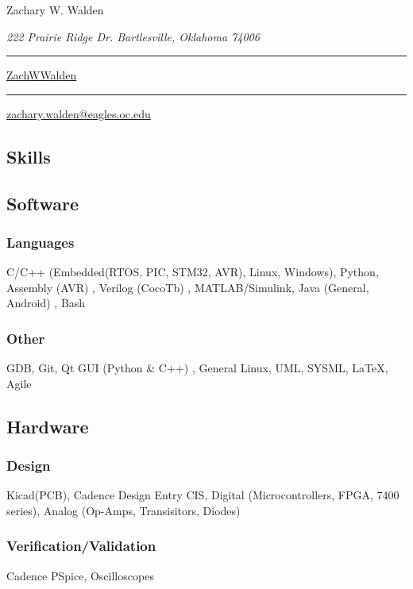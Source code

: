 \documentclass{article}
\newcommand\mybar{\kern1pt\rule[-\dp\strutbox]{.8pt}{\baselineskip}\kern1pt}
\begin{document}
\begin{center}
	\begin{Huge}
		Zachary W. Walden\\
	\end{Huge}
	\begin{large}
		\textsl{222 Prairie Ridge Dr. Bartlesville, Oklahoma 74006}\\
	\end{large}
	\begin{small}
		 \mybar { } \faGithub \href{https://github.com/ZachWWalden}{ ZachWWalden}
		\mybar { }\faEnvelope\href{mailto::zachary.walden@eagles.oc.edu}{ zachary.walden@eagles.oc.edu}
	\end{small}
\end{center}
\begin{spacing}{.5}
\section{Skills}
	\subsection{Software}
		\subsubsection{Languages} \small{C/C++} \scriptsize{(Embedded(RTOS, PIC, STM32, AVR), Linux, Windows)}\small{, Python, Assembly} \scriptsize{(AVR)} \small{, Verilog} \scriptsize{(CocoTb)} \small{, MATLAB/Simulink, Java} \scriptsize{(General, Android)} \small{, Bash}
		\subsubsection{Other} \small{GDB, Git, Qt GUI} \scriptsize{(Python \& C++)} \small{, General Linux, UML, SYSML, \LaTeX, Agile}
	\subsection{Hardware}
		\subsubsection{Design} \small{Kicad(PCB), Cadence Design Entry CIS, Digital} \scriptsize{(Microcontrollers, FPGA, 7400 series)}\small{, Analog} \scriptsize{(Op-Amps, Transisitors, Diodes)}
		\small{\subsubsection{Verification/Validation} Cadence PSpice, Oscilloscopes}

\end{spacing}
\end{document}
